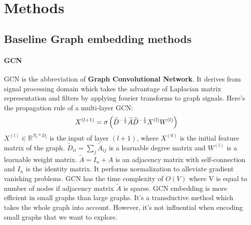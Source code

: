 \documentclass[sigconf]{acmart}
\begin{document}
\section{Methods}


\subsection{Baseline Graph embedding methods}
\paragraph{GCN} GCN is the abbreviation of \textbf{Graph Convolutional Network}\cite{kipf2016semi}. It derives from  signal processing domain which takes the advantage of Laplacian matrix representation and filters by applying fourier transforms to graph signals. Here's the propagation rule of a multi-layer GCN: 
\begin{equation}
\setlength\abovedisplayskip{5pt}%
\setlength\belowdisplayskip{5pt}
X^{\left(l+1\right)} = \sigma\left(\widetilde D^{-\frac{1}{2}} \widetilde A \widetilde D^{-\frac{1}{2}} X^{(l)} W^{(l)}\right)\\
\end{equation}
$X^{(l)} \in  \mathbb R^{N_{l} * D_{l}}$ is the input of layer $(l+1)$, where $X^{(0)}$ is the initial feature matrix of the graph. $\widetilde D_{ii} = \sum_{j}\widetilde A_{ij}$ is a learnable degree matrix and $W^{(l)}$ is a learnable weight matrix. $\widetilde A = I_{n} + A$ is an adjacency matrix with self-connection and $I_{n}$ is the identity matrix. It performs normalization to alleviate gradient vanishing problems.  GCN has the time complexity of $O(V)$ where V is equal to number of nodes if adjacency matrix $\widetilde 
A$ is sparse. GCN embedding is more efficient in small graphs than large graphs. It's a transductive method which takes the whole graph into account. However, it's not influential when encoding small graphs that we want to explore.
\end{document}
